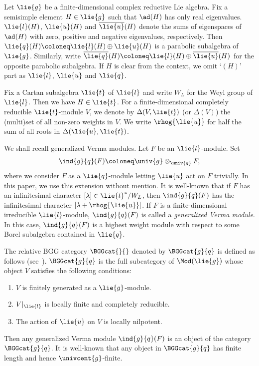 Let $\lie{g}$ be a finite-dimensional complex reductive Lie algebra.
Fix a semisimple element $H \in \lie{g}$ such that $\ad(H)$ has only real eigenvalues.
$\lie{l}(H)$, $\lie{u}(H)$ and $\overline{\lie{u}}(H)$ denote the sums of eigenspaces of $\ad(H)$
with zero, positive and negative eigenvalues, respectively.
Then $\lie{q}(H)\coloneq \lie{l}(H)\oplus \lie{u}(H)$ is a parabolic subalgebra of $\lie{g}$.
Similarly, write $\overline{\lie{q}}(H)\coloneq \lie{l}(H) \oplus \overline{\lie{u}}(H)$ for the opposite parabolic subalgebra.
If $H$ is clear from the context, we omit `$(H)$' part as $\lie{l}$, $\lie{u}$ and $\lie{q}$.

Fix a Cartan subalgebra $\lie{t}$ of $\lie{l}$ and write $W_L$ for the Weyl group of $\lie{l}$.
Then we have $H \in \lie{t}$.
For a finite-dimensional completely reducible $\lie{t}$-module $V$, we denote by $\Delta(V, \lie{t})$ (or $\Delta(V)$) the (multi)set of all non-zero weights in $V$.
We write $\rhog{\lie{u}}$ for half the sum of all roots in $\Delta(\lie{u}, \lie{t})$.

We shall recall generalized Verma modules.
Let $F$ be an $\lie{l}$-module.
Set
\begin{align*}
	\ind{g}{q}(F)\coloneq \univ{g}\otimes_{\univ{q}}F,
\end{align*}
where we consider $F$ as a $\lie{q}$-module letting $\lie{u}$ act on $F$ trivially.
In this paper, we use this extension without mention.
It is well-known that if $F$ has an infinitesimal character $[\lambda] \in \lie{t}^* / W_L$,
then $\ind{g}{q}(F)$ has the infinitesimal character $[\lambda + \rhog{\lie{u}}]$.
If $F$ is a finite-dimensional irreducible $\lie{l}$-module,
$\ind{g}{q}(F)$ is called a \emph{generalized Verma module}.
In this case, $\ind{g}{q}(F)$ is a highest weight module with respect to some Borel subalgebra contained in $\lie{q}$.

The relative BGG category $\BGGcat{}{}$ denoted by $\BGGcat{g}{q}$ is defined as follows (see~\cite[Section~9]{Hu08_category_o}).
$\BGGcat{g}{q}$ is the full subcategory of $\Mod(\lie{g})$ whose object $V$ satisfies the following conditions:
\begin{enumerate}\itemsep=0pt
 \item $V$ is finitely generated as a $\lie{g}$-module.
 \item $V|_{\lie{l}}$ is locally finite and completely reducible.
 \item The action of $\lie{u}$ on $V$ is locally nilpotent.
\end{enumerate}
Then any generalized Verma module $\ind{g}{q}(F)$ is an object of the category $\BGGcat{g}{q}$.
It is well-known that any object in $\BGGcat{g}{q}$ has finite length and hence $\univcent{g}$-finite.

